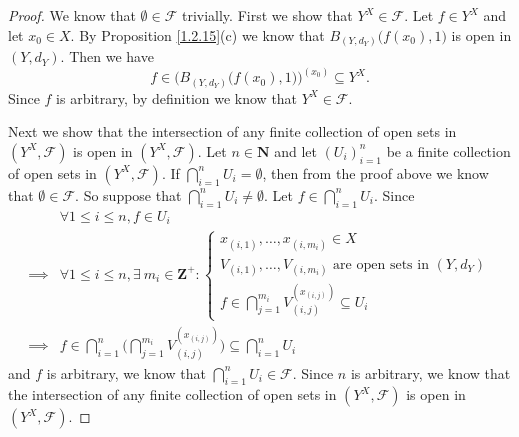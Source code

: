 \begin{proof}
    We know that \(\emptyset \in \mathcal{F}\) trivially.
    First we show that \(Y^X \in \mathcal{F}\).
    Let \(f \in Y^X\) and let \(x_0 \in X\).
    By Proposition \ref{1.2.15}(c) we know that \(B_{(Y, d_Y)}\big(f(x_0), 1\big)\) is open in \((Y, d_Y)\).
    Then we have
    \[
        f \in \Big(B_{(Y, d_Y)}\big(f(x_0), 1\big)\Big)^{(x_0)} \subseteq Y^X.
    \]
    Since \(f\) is arbitrary, by definition we know that \(Y^X \in \mathcal{F}\).

    Next we show that the intersection of any finite collection of open sets in \((Y^X, \mathcal{F})\) is open in \((Y^X, \mathcal{F})\).
    Let \(n \in \mathbf{N}\) and let \((U_i)_{i = 1}^n\) be a finite collection of open sets in \((Y^X, \mathcal{F})\).
    If \(\bigcap_{i = 1}^n U_i = \emptyset\), then from the proof above we know that \(\emptyset \in \mathcal{F}\).
    So suppose that \(\bigcap_{i = 1}^n U_i \neq \emptyset\).
    Let \(f \in \bigcap_{i = 1}^n U_i\).
    Since
    \begin{align*}
                 & \forall 1 \leq i \leq n, f \in U_i                                                                                          \\
        \implies & \forall 1 \leq i \leq n, \exists\ m_i \in \mathbf{Z}^+ : \begin{cases}
                                                                                x_{(i, 1)}, \dots, x_{(i, m_i)} \in X                              \\
                                                                                V_{(i, 1)}, \dots, V_{(i, m_i)} \text{ are open sets in } (Y, d_Y) \\
                                                                                f \in \bigcap_{j = 1}^{m_i} V_{(i, j)}^{(x_{(i, j)})} \subseteq U_i
                                                                            \end{cases} \\
        \implies & f \in \bigcap_{i = 1}^n \bigg(\bigcap_{j = 1}^{m_i} V_{(i, j)}^{(x_{(i, j)})}\bigg) \subseteq \bigcap_{i = 1}^n U_i
    \end{align*}
    and \(f\) is arbitrary, we know that \(\bigcap_{i = 1}^n U_i \in \mathcal{F}\).
    Since \(n\) is arbitrary, we know that the intersection of any finite collection of open sets in \((Y^X, \mathcal{F})\) is open in \((Y^X, \mathcal{F})\).


\end{proof}
